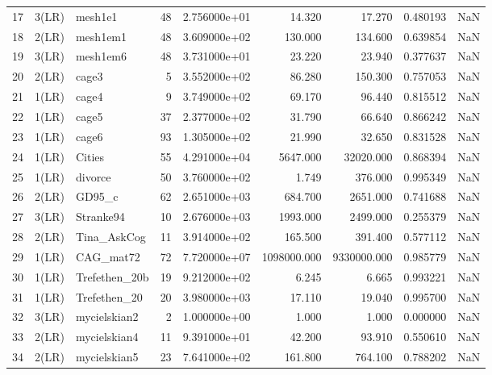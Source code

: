 \begin{tabular}{lllrrrrrr}
17 &  3(LR) &        mesh1e1 &    48 &  2.756000e+01 &       14.320 &       17.270 &  0.480193 &   NaN \\
18 &  2(LR) &       mesh1em1 &    48 &  3.609000e+02 &      130.000 &      134.600 &  0.639854 &   NaN \\
19 &  3(LR) &       mesh1em6 &    48 &  3.731000e+01 &       23.220 &       23.940 &  0.377637 &   NaN \\
20 &  2(LR) &          cage3 &     5 &  3.552000e+02 &       86.280 &      150.300 &  0.757053 &   NaN \\
21 &  1(LR) &          cage4 &     9 &  3.749000e+02 &       69.170 &       96.440 &  0.815512 &   NaN \\
22 &  1(LR) &          cage5 &    37 &  2.377000e+02 &       31.790 &       66.640 &  0.866242 &   NaN \\
23 &  1(LR) &          cage6 &    93 &  1.305000e+02 &       21.990 &       32.650 &  0.831528 &   NaN \\
24 &  1(LR) &         Cities &    55 &  4.291000e+04 &     5647.000 &    32020.000 &  0.868394 &   NaN \\
25 &  1(LR) &        divorce &    50 &  3.760000e+02 &        1.749 &      376.000 &  0.995349 &   NaN \\
26 &  2(LR) &         GD95\_c &    62 &  2.651000e+03 &      684.700 &     2651.000 &  0.741688 &   NaN \\
27 &  3(LR) &      Stranke94 &    10 &  2.676000e+03 &     1993.000 &     2499.000 &  0.255379 &   NaN \\
28 &  2(LR) &    Tina\_AskCog &    11 &  3.914000e+02 &      165.500 &      391.400 &  0.577112 &   NaN \\
29 &  1(LR) &      CAG\_mat72 &    72 &  7.720000e+07 &  1098000.000 &  9330000.000 &  0.985779 &   NaN \\
30 &  1(LR) &  Trefethen\_20b &    19 &  9.212000e+02 &        6.245 &        6.665 &  0.993221 &   NaN \\
31 &  1(LR) &   Trefethen\_20 &    20 &  3.980000e+03 &       17.110 &       19.040 &  0.995700 &   NaN \\
32 &  3(LR) &   mycielskian2 &     2 &  1.000000e+00 &        1.000 &        1.000 &  0.000000 &   NaN \\
33 &  2(LR) &   mycielskian4 &    11 &  9.391000e+01 &       42.200 &       93.910 &  0.550610 &   NaN \\
34 &  2(LR) &   mycielskian5 &    23 &  7.641000e+02 &      161.800 &      764.100 &  0.788202 &   NaN \\

\end{tabular}
